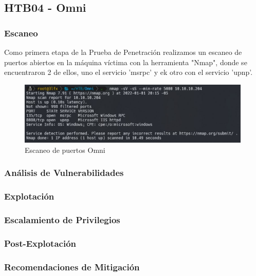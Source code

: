\subsection{HTB04 - Omni}

    \subsubsection{Escaneo}
        \large{Como primera etapa de la Prueba de Penetración realizamos un escaneo de puertos abiertos en la máquina víctima con la herramienta "Nmap", donde se encuentraron 2 de ellos, uno el servicio 'msrpc' y ek otro con el servicio 'upnp'.}
        \par
        \begin{figure}[h!]
            \centering
            \includegraphics[width=0.99\textwidth]{informe4/imagenes/omni/01_escaneo.png}
            \caption{Escaneo de puertos Omni} 
        \end{figure}  

    \subsubsection{Análisis de Vulnerabilidades}

    \subsubsection{Explotación}

    \subsubsection{Escalamiento de Privilegios}

    \subsubsection{Post-Explotación}

    \subsubsection{Recomendaciones de Mitigación}